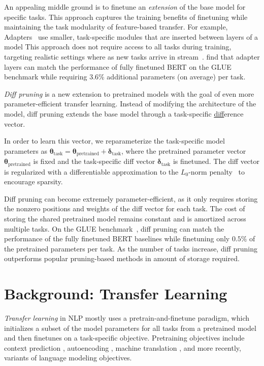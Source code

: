 An appealing middle ground is to finetune an \textit{extension} of the base model for specific tasks. This approach captures the training benefits of finetuning while maintaining the task modularity of feature-based transfer. For example, Adapters~\citep{rebuffi2018adap} use smaller, task-specific modules that are inserted between layers of a model This approach does not require access to all tasks during training, targeting realistic settings where as new tasks arrive in stream~\citep{houlsby2019adapters,pfeiffer2020fusion,pfeiffer2020adapterhub,pfeiffer2020madx}. 
 \citet{houlsby2019adapters} find that adapter layers can match the performance of fully finetuned BERT on the GLUE benchmark  while requiring 3.6\% additional parameters (on average) per task.

\emph{Diff pruning} is a new extension to pretrained models with the goal of even more parameter-efficient transfer learning. Instead of modifying the architecture of the model, diff pruning extends the base model through a task-specific \underline{diff}erence  vector. 

 In order to learn this vector, we reparameterize the task-specific model parameters as $\boldsymbol{\theta}_\text{task} = \boldsymbol{\theta}_\text{pretrained} + \boldsymbol{\delta}_\text{task}$, where the pretrained parameter vector $\boldsymbol{\theta}_\text{pretrained}$ is fixed  and  the task-specific diff vector $\boldsymbol{\delta}_\text{task}$ is finetuned. The diff vector is regularized with a differentiable approximation to the $L_0$-norm penalty~\citep{louizos2018sparse} to encourage sparsity. 

 Diff pruning can become extremely parameter-efficient, as it only requires storing the nonzero positions and weights of the diff vector for each task. The cost of storing the shared pretrained model remains constant and is amortized across multiple tasks. On the GLUE benchmark~\citep{wang-etal-2018-glue}, diff pruning can match the performance of the fully finetuned BERT baselines  while finetuning only $0.5\%$ of the pretrained parameters per task. As the number of tasks increase, diff pruning outperforms popular pruning-based methods in amount of storage required. 

\section{Background: Transfer Learning}

\emph{Transfer learning} in NLP mostly uses a pretrain-and-finetune paradigm, which initializes a subset of the model parameters for all tasks from a pretrained model and then finetunes on a task-specific objective. Pretraining objectives include context prediction \citep{Mikolov2013a}, autoencoding \citep{Dai2015}, machine translation \citep{NIPS2017_7209},  and more recently, variants of language modeling  \citep{peters2018elmo,radford2018gp,devlin2018bert} objectives.


